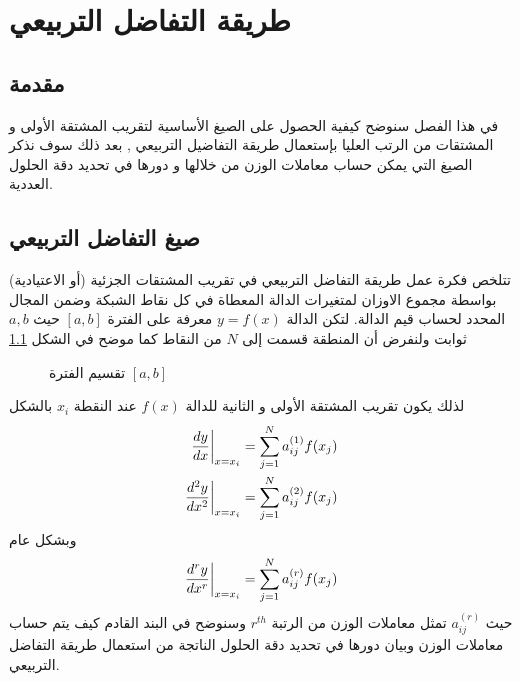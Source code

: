 \chapter{طريقة التفاضل التربيعي}
\section[مقدمة]{مقدمة }

في هذا الفصل سنوضح كيفية الحصول على الصيغ الأساسية لتقريب المشتقة الأولى و المشتقات من الرتب العليا بإستعمال طريقة التفاضيل التربيعي , بعد ذلك سوف نذكر الصيغ التي يمكن حساب معاملات الوزن من خلالها و دورها في تحديد دقة الحلول العددية.

\section[صيغ التفاضل التربيعي]{صيغ التفاضل التربيعي }

تتلخص فكرة عمل طريقة التفاضل التربيعي في تقريب المشتقات الجزئية (أو الاعتيادية) بواسطة مجموع الاوزان لمتغيرات الدالة المعطاة في كل نقاط الشبكة وضمن المجال المحدد لحساب قيم الدالة. لتكن الدالة $y=f(x)$ معرفة على الفترة $[a,b]$ حيث $a,b$ ثوابت ولنفرض أن المنطقة قسمت إلى $N$ من النقاط كما موضح في الشكل \ref{fig:numberline}\cite{chang_shu}

\begin{figure}[H]
	\centering
	
	\caption{تقسيم الفترة $[a,b]$}
	\label{fig:numberline}
\end{figure}

لذلك يكون تقريب المشتقة الأولى و الثانية للدالة $f(x)$ عند النقطة $x_i$ بالشكل
\begin{align}
	\left.\frac{dy}{dx}\right|_{x=x_i}=\sum_{j=1}^{N}a_{ij}^{(1)}f(x_j)\\
	\left.\frac{d^2y}{dx^2}\right|_{x=x_i}=\sum_{j=1}^{N}a_{ij}^{(2)}f(x_j)
\end{align}
وبشكل عام
\begin{equation}
	\label{eq:DQM_formula}
	\left.\frac{d^ry}{dx^r}\right|_{x=x_i}=\sum_{j=1}^{N}a_{ij}^{(r)}f(x_j)
\end{equation}
حيث $a_{ij}^{(r)}$ تمثل معاملات الوزن من الرتبة $r^{th}$ وسنوضح في البند القادم كيف يتم حساب معاملات الوزن وبيان دورها في تحديد دقة الحلول الناتجة من استعمال طريقة التفاضل التربيعي.

